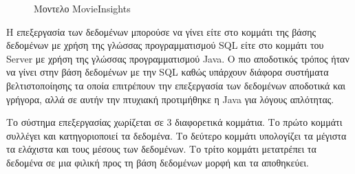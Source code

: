 \begin{figure}[p]
    \vspace*{-1cm}
    \hspace*{-1cm}
   \caption{Μοντελο MovieInsights}
   \label{model:movieinsights}
\end{figure}

Η επεξεργασία των δεδομένων μπορούσε να γίνει είτε στο κομμάτι της βάσης δεδομένων με χρήση της γλώσσας προγραμματισμού SQL είτε στο κομμάτι του Server με χρήση της γλώσσας προγραμματισμού Java. Ο πιο αποδοτικός τρόπος ήταν να γίνει στην βάση δεδομένων με την SQL καθώς υπάρχουν διάφορα συστήματα βελτιστοποίησης τα οποία επιτρέπουν την επεξεργασία των δεδομένων αποδοτικά και γρήγορα, αλλά σε αυτήν την πτυχιακή προτιμήθηκε η Java για λόγους απλότητας.

Το σύστημα επεξεργασίας χωρίζεται σε 3 διαφορετικά κομμάτια. Το πρώτο κομμάτι συλλέγει και κατηγοριοποιεί τα δεδομένα. Το δεύτερο κομμάτι υπολογίζει τα μέγιστα τα ελάχιστα και τους μέσους των δεδομένων. Το τρίτο
κομμάτι μετατρέπει τα δεδομένα σε μια φιλική προς τη βάση δεδομένων μορφή και τα αποθηκεύει.



